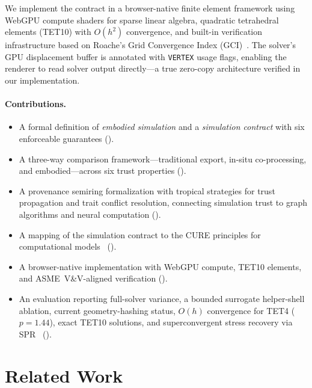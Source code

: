 \documentclass[journal]{IEEEtran}
\begin{document}
We implement the contract in a browser-native finite element framework using
WebGPU compute shaders for sparse linear algebra, quadratic tetrahedral
elements (TET10) with $O(h^2)$ convergence, and built-in verification
infrastructure based on Roache's Grid Convergence Index
(GCI)~\cite{Roache1994,Roache1998}. The solver's GPU displacement buffer
is annotated with \texttt{VERTEX} usage flags, enabling the renderer to
read solver output directly---a true zero-copy architecture verified in
our implementation.

\paragraph{Contributions.}
\begin{itemize}
  \item A formal definition of \emph{embodied simulation} and a
    \emph{simulation contract} with six enforceable guarantees
    ().
  \item A three-way comparison framework---traditional export, in-situ
    co-processing, and embodied---across six trust properties
    ().
  \item A provenance semiring formalization with tropical strategies for
    trust propagation and trait conflict resolution, connecting simulation
    trust to graph algorithms and neural computation
    ().
  \item A mapping of the simulation contract to the CURE principles for
    computational models~\cite{CURE2026} ().
  \item A browser-native implementation with WebGPU compute, TET10
    elements, and ASME~V\&V-aligned verification ().
  \item An evaluation reporting full-solver variance, a bounded surrogate
    helper-shell ablation, current geometry-hashing status, $O(h)$ convergence
    for TET4 ($p = 1.44$), exact TET10 solutions, and
    superconvergent stress recovery via SPR~\cite{ZZ1992}
    ().
\end{itemize}


\section{Related Work}
\label{sec:related}
\end{document}
